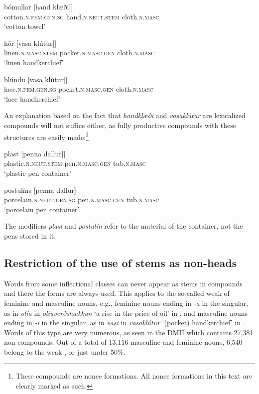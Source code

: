 \documentclass[output=paper]{LSP/langsci}
\begin{document}
\begin{xlist}
\ex
\gll {\ob}bómullar [hand klæði]]  \\
 cotton\textsc{.n.fem.gen.sg} hand\textsc{.n.neut.stem} cloth\textsc{.n.masc}\\
\glt ‘cotton towel’

\ex
\gll {\ob}hör [vasa klútur]]  \\
 linen\textsc{.n.masc.stem} pocket\textsc{.n.masc.gen} cloth\textsc{.n.masc}\\
\glt ‘linen handkerchief’

\ex
\gll {\ob}blúndu [vasa klútur]]  \\
 lace\textsc{.n.fem.gen.sg} pocket\textsc{.n.masc.gen} cloth\textsc{.n.masc}\\
\glt ‘lace handkerchief’
\z
\z\largerpage[2]

An explanation based on the fact that \textit{handklæði} and \textit{vasaklútur} are lexicalized compounds will not suffice either, as fully productive compounds with these structures are easily made:\footnote{These compounds are nonce formations. All nonce formations in this text are clearly marked as such.}

\ea%
 \label{ex:bjarnadottir:12} 
\ea 
\gll {\ob}plast [penna dallur]]\\
 plastic\textsc{.n.neut.stem} pen\textsc{.n.masc.gen} tub\textsc{.n.masc}\\
\glt ‘plastic pen container’

\ex
\gll {\ob}postulíns [penna dallur] \\
 porcelain\textsc{.n.neut.gen.sg} pen\textsc{.n.masc.gen} tub\textsc{.n.masc}\\
\glt ‘porcelain pen container’
\z
\z

The modifiers \textit{plast} and \textit{postulín} refer to the material of the container, not the pens stored in it.

\subsection{Restriction of the use of stems as non-heads}\label{sec:bjarnadottir:2.5}

Words from some inflectional classes can never appear as stems in compounds and there the  forms are always used. This applies to the so-called weak  of feminine and masculine nouns, e.g., feminine nouns ending in \textit{-a} in the  singular, as in \textit{olía} in \textit{olíuverðshækkun} ‘a rise in the price of oil’ in , and masculine nouns ending in \textit{-i} in the  singular, as in \textit{vasi} in \textit{vasaklútur} ‘(pocket) handkerchief’ in . Words of this type are very numerous, as seen in the DMII which contains 27,381 non-compounds. Out of a total of 13,116 masculine and feminine nouns, 6,540 belong to the weak , or just under 50\%.


\end{xlist}
\end{document}
